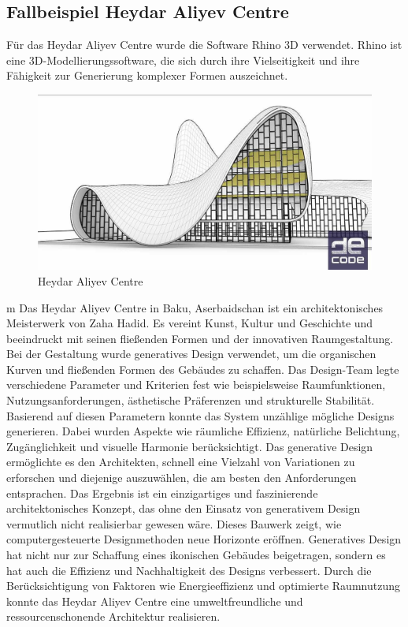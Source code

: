 \subsection*{Fallbeispiel Heydar Aliyev Centre}
Für das Heydar Aliyev Centre wurde die Software Rhino 3D verwendet. Rhino ist eine 3D-Modellierungssoftware, die sich durch ihre Vielseitigkeit und ihre Fähigkeit zur Generierung komplexer Formen auszeichnet.

\begin{figure}[h]
    \begin{minipage}{0.5\textwidth}
      \centering
      \includegraphics[width=\textwidth]{./images/DE_Rh_lvl1_baku.jpg}
    \end{minipage}
    \caption{Heydar Aliyev Centre}
    \label{fig:meinbild}
  \end{figure}
m
Das Heydar Aliyev Centre in Baku, Aserbaidschan ist ein architektonisches Meisterwerk von Zaha Hadid. Es vereint Kunst, Kultur und Geschichte und beeindruckt mit seinen fließenden Formen und der innovativen Raumgestaltung. 
Bei der Gestaltung wurde generatives Design verwendet, um die organischen Kurven und fließenden Formen des Gebäudes zu schaffen. Das Design-Team legte verschiedene Parameter und Kriterien fest wie beispielsweise Raumfunktionen, Nutzungsanforderungen, ästhetische Präferenzen und strukturelle Stabilität. 
Basierend auf diesen Parametern konnte das System unzählige mögliche Designs generieren. Dabei wurden Aspekte wie räumliche Effizienz, natürliche Belichtung, Zugänglichkeit und visuelle Harmonie berücksichtigt. Das generative Design ermöglichte es den Architekten, schnell eine Vielzahl von Variationen zu erforschen und diejenige auszuwählen, die am besten den Anforderungen entsprachen. 
Das Ergebnis ist ein einzigartiges und faszinierende architektonisches Konzept, das ohne den Einsatz von generativem Design vermutlich nicht realisierbar gewesen wäre. Dieses Bauwerk zeigt, wie computergesteuerte Designmethoden neue Horizonte eröffnen. 
Generatives Design hat nicht nur zur Schaffung eines ikonischen Gebäudes beigetragen, sondern es hat auch die Effizienz und Nachhaltigkeit des Designs verbessert. Durch die Berücksichtigung von Faktoren wie Energieeffizienz und optimierte Raumnutzung konnte das Heydar Aliyev Centre eine umweltfreundliche und ressourcenschonende Architektur realisieren. \autocite*{5}
